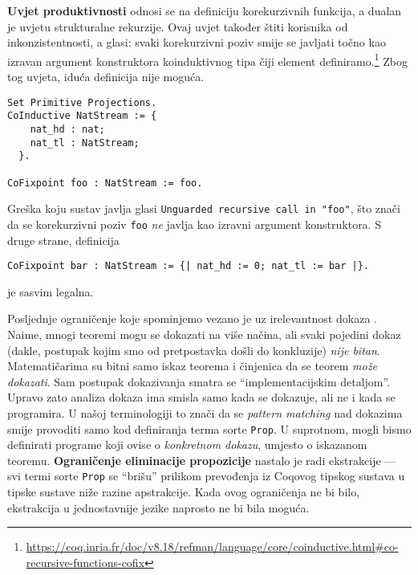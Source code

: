 \textbf{Uvjet produktivnosti} odnosi se na definiciju korekurzivnih funkcija, a dualan je uvjetu strukturalne rekurzije.
Ovaj uvjet također štiti korisnika od inkonzistentnosti, a glasi: svaki korekurzivni poziv smije se javljati točno kao izravan argument konstruktora koinduktivnog tipa čiji element definiramo.\footnote{\url{https://coq.inria.fr/doc/v8.18/refman/language/core/coinductive.html\#co-recursive-functions-cofix}}
Zbog tog uvjeta, iduća definicija nije moguća.
\begin{verbatim}
Set Primitive Projections.
CoInductive NatStream := {
    nat_hd : nat;
    nat_tl : NatStream;
  }.

CoFixpoint foo : NatStream := foo.
\end{verbatim}
Greška koju sustav javlja glasi \texttt{Unguarded recursive call in "foo"},
što znači da se korekurzivni poziv \texttt{foo} \textit{ne} javlja kao izravni argument konstruktora.
S druge strane, definicija
\begin{verbatim}
CoFixpoint bar : NatStream := {| nat_hd := 0; nat_tl := bar |}.
\end{verbatim}
\noindent je sasvim legalna.



Posljednje ograničenje koje spominjemo vezano je uz irelevantnost dokaza .
Naime, mnogi teoremi mogu se dokazati na više načina, ali svaki pojedini dokaz (dakle, postupak kojim smo od pretpostavka došli do konkluzije) \textit{nije bitan}.
Matematičarima su bitni samo iskaz teorema i činjenica da se teorem \textit{može dokazati}.
Sam postupak dokazivanja smatra se ``implementacijskim detaljom''.
Upravo zato analiza dokaza ima smisla samo kada se dokazuje, ali ne i kada se programira.
U našoj terminologiji to znači da se \textit{pattern matching} nad dokazima smije provoditi samo kod definiranja terma sorte \texttt{Prop}.
U suprotnom, mogli bismo definirati programe koji ovise o \textit{konkretnom dokazu}, umjesto o iskazanom teoremu.
\textbf{Ograničenje eliminacije propozicije} nastalo je radi ekstrakcije ---
svi termi sorte \texttt{Prop} se ``brišu'' prilikom prevođenja iz Coqovog tipskog sustava u tipske sustave niže razine apstrakcije.
Kada ovog ograničenja ne bi bilo, ekstrakcija u jednostavnije jezike naprosto ne bi bila moguća.


